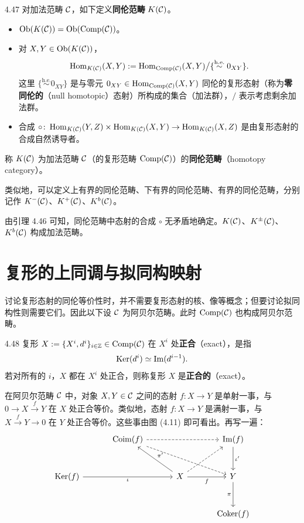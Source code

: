 \begin{definition}{4.47}
对加法范畴 $\mathcal{C}$，如下定义\textbf{同伦范畴} $K(\mathcal{C})$。
\begin{itemize}
  \item $\operatorname{Ob}(K(\mathcal{C}))=\operatorname{Ob}(\operatorname{Comp}(\mathcal{C}))$。
  \item 对 $X,Y\in\operatorname{Ob}(K(\mathcal{C}))$，
        \[ \operatorname{Hom}_{K(\mathcal{C})}(X,Y):=\operatorname{Hom}_{\operatorname{Comp}(\mathcal{C})}(X,Y)\big/\{\overset{\mathrm{h.e.}}{\sim}0_{XY}\}. \]
        这里 $\{\overset{\mathrm{h.e.}}{\sim}0_{XY}\}$ 是与零元 $0_{XY}\in\operatorname{Hom}_{\operatorname{Comp}(\mathcal{C})}(X,Y)$ 同伦的复形态射（称为\textbf{零同伦的}（null homotopic）态射）所构成的集合（加法群），$/$ 表示考虑剩余加法群。
  \item 合成 $\circ\colon\operatorname{Hom}_{K(\mathcal{C})}(Y,Z)\times\operatorname{Hom}_{K(\mathcal{C})}(X,Y)\to\operatorname{Hom}_{K(\mathcal{C})}(X,Z)$ 是由复形态射的合成自然诱导者。
\end{itemize}
\end{definition}

称 $K(\mathcal{C})$ 为加法范畴 $\mathcal{C}$（的复形范畴 $\operatorname{Comp}(\mathcal{C})$）的\textbf{同伦范畴}（homotopy category）。

类似地，可以定义上有界的同伦范畴、下有界的同伦范畴、有界的同伦范畴，分别记作 $K^-(\mathcal{C})$、$K^+(\mathcal{C})$、$K^b(\mathcal{C})$。

由引理 4.46 可知，同伦范畴中态射的合成 $\circ$ 无矛盾地确定。$K(\mathcal{C})$、$K^\pm(\mathcal{C})$、$K^b(\mathcal{C})$ 构成加法范畴。

\section{复形的上同调与拟同构映射}

讨论复形态射的同伦等价性时，并不需要复形态射的核、像等概念；但要讨论拟同构性则需要它们。因此以下设 $\mathcal{C}$ 为阿贝尔范畴。此时 $\operatorname{Comp}(\mathcal{C})$ 也构成阿贝尔范畴。

\begin{definition}{4.48}
复形 $X:=\{X^i,d^i\}_{i\in\mathbb{Z}}\in\operatorname{Comp}(\mathcal{C})$ 在 $X^i$ 处\textbf{正合}（exact），是指
\[ \operatorname{Ker}(d^i)\simeq\operatorname{Im}(d^{i-1}). \]
若对所有的 $i$，$X$ 都在 $X^i$ 处正合，则称复形 $X$ 是\textbf{正合的}（exact）。
\end{definition}

在阿贝尔范畴 $\mathcal{C}$ 中，对象 $X,Y\in\mathcal{C}$ 之间的态射 $f\colon X\to Y$ 是单射一事，与 $0\to X\xrightarrow{f}Y$ 在 $X$ 处正合等价。类似地，态射 $f\colon X\to Y$ 是满射一事，与 $X\xrightarrow{f}Y\to 0$ 在 $Y$ 处正合等价。这些事由图 (4.11) 即可看出。再写一遍：
\[\begin{tikzcd}[row sep=2.8em, column sep=3.2em]
  & \Coim(f) \arrow[rr,dashed] \arrow[drr,dashed] & & \Img(f) \arrow[d,"\iota'"] \\
  \Ker(f) \arrow[rr,"\iota"'] & & X \arrow[ul,"\pi'"'] \arrow[r,"f"'] \arrow[ur,dashed] & Y \arrow[d,"\pi"'] \\
  & & & \Coker(f)
\end{tikzcd}\]

